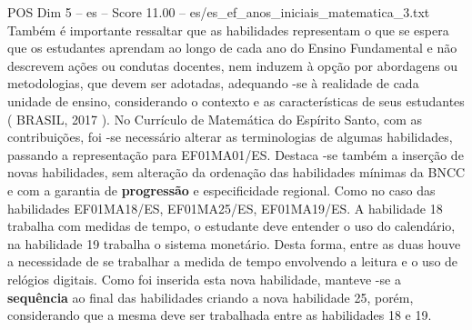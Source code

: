 \begin{textsample}{POS Dim 5 – es – Score 11.00 – es/es\_ef\_anos\_iniciais\_matematica\_3.txt}
Também é importante ressaltar que as habilidades representam o que se espera que os estudantes aprendam ao longo de cada ano do Ensino Fundamental e não descrevem ações ou condutas docentes, nem induzem à opção por abordagens ou metodologias, que devem ser adotadas, adequando -se à realidade de cada unidade de ensino, considerando o contexto e as características de seus estudantes ( BRASIL, 2017 ).
No Currículo de Matemática do Espírito Santo, com as contribuições, foi -se necessário alterar as terminologias de algumas habilidades, passando a representação para EF01MA01/ES.
Destaca -se também a inserção de novas habilidades, sem alteração da ordenação das habilidades mínimas da BNCC e com a garantia de \textbf{progressão} e especificidade regional.
Como no caso das habilidades EF01MA18/ES, EF01MA25/ES, EF01MA19/ES.
A habilidade 18 trabalha com medidas de tempo, o estudante deve entender o uso do calendário, na habilidade 19 trabalha o sistema monetário.
Desta forma, entre as duas houve a necessidade de se trabalhar a medida de tempo envolvendo a leitura e o uso de relógios digitais.
Como foi inserida esta nova habilidade, manteve -se a \textbf{sequência} ao final das habilidades criando a nova habilidade 25, porém, considerando que a mesma deve ser trabalhada entre as habilidades 18 e 19.

\end{textsample}
